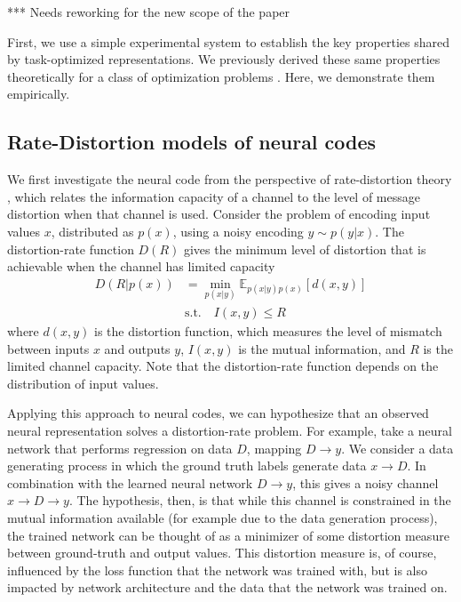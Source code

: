 \documentclass[10pt]{article}      %
\newcommand{\st}{\mathrm{s.t.}}
\begin{document}
*** Needs reworking for the new scope of the paper


First, we use a simple experimental system to establish the key properties shared by task-optimized representations.
We previously derived these same properties theoretically for a class of optimization problems \cite{rast_adaptation_2020}.
Here, we demonstrate them empirically. 


\subsection{Rate-Distortion models of neural codes}

We first investigate the neural code from the perspective of rate-distortion theory \cite{cover1999elements}, which relates the information capacity of a channel to the level of message distortion when that channel is used.
Consider the problem of encoding input values $x$, distributed as $p(x)$, using a noisy encoding $y \sim p(y|x)$.
The distortion-rate function $D(R)$ gives the minimum level of distortion that is achievable when the channel has limited capacity
\begin{align}
  D(R | p(x) ) &= \min_{p(x|y)} \mathbb{E}_{p(x|y) p(x)}[d(x, y)]  \label{eq:distortion-rate1} \\
               &\st \quad   I(x, y)\le R  \label{eq:distortion-rate2}
\end{align}
where $d(x,y)$ is the distortion function, which measures the level of mismatch between inputs $x$ and outputs $y$, $I(x,y)$ is the mutual information, and $R$ is the limited channel capacity.
Note that the distortion-rate function depends on the distribution of input values.

Applying this approach to neural codes, we can hypothesize that an observed neural representation solves a distortion-rate problem.
For example, take a neural network that performs regression on data $D$, mapping $D \to y$.
We consider a data generating process in which the ground truth labels generate data ${x \to D}$.
In combination with the learned neural network $D \to y$, this gives a noisy channel $x \to D \to y$.
The hypothesis, then, is that while this channel is constrained in the mutual information available (for example due to the data generation process), the trained network can be thought of as a minimizer of some distortion measure between ground-truth and output values. 
This distortion measure is, of course, influenced by the loss function that the network was trained with, but is also impacted by network architecture and the data that the network was trained on.
\end{document}
